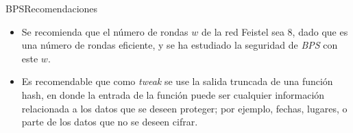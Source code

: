 \begin{frame}{BPS}{Recomendaciones}

  \begin{itemize}
    \item Se recomienda que el número de rondas $w$ de la red Feistel sea
      $8$, dado que es una número de rondas eficiente, y se ha estudiado
      la seguridad de \textit{BPS} con este $w$.

    \item Es recomendable que como \textit{tweak} se use la salida truncada de
      una función hash, en donde la entrada de la función puede ser cualquier
      información relacionada a los datos que se deseen proteger; por
      ejemplo, fechas, lugares, o parte de los datos que no se deseen cifrar.
  \end{itemize}

\end{frame}

